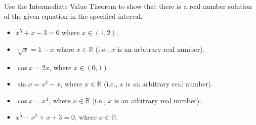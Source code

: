 Use the Intermediate Value Theorem to show that there is a real number solution of the given equation in the specified interval. 
\begin{multicols}{2}
\begin{itemize}
\item $x^5+x-3=0$ where $x\in (1,2)$.
\item $\sqrt[4]{x}=1-x$ where $x\in \mathbb R$ (i.e., $x$ is an arbitrary real number).
\item $\cos x=2x$, where $x\in (0,1)$.
\item $\sin x=x^2-x$, where $x\in \mathbb R$ (i.e., $x$ is an arbitrary real number).
\item $\cos x=x^4$, where $x\in \mathbb R$ (i.e., $x$ is an arbitrary real number).
\item $x^5-x^2+x+3=0$, where $x\in \mathbb R$.
\end{itemize}
\end{multicols}
